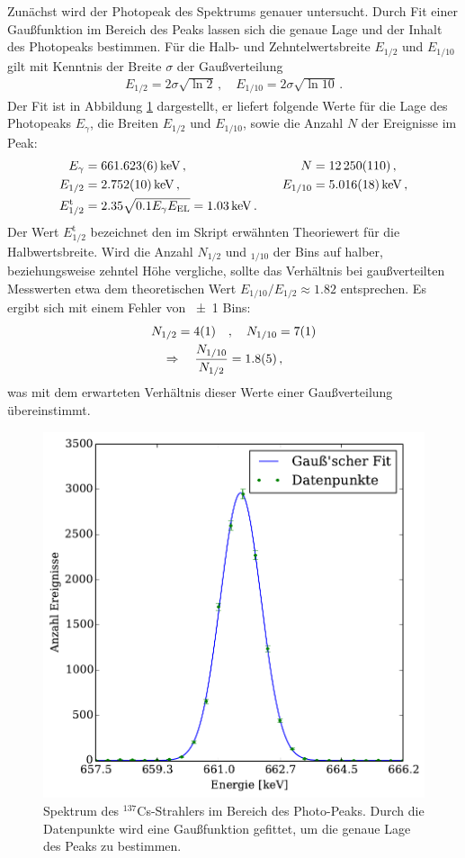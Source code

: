 Zunächst wird der Photopeak des Spektrums genauer untersucht. Durch Fit einer
Gaußfunktion im Bereich des Peaks lassen sich die genaue Lage und der Inhalt
des Photopeaks bestimmen.
Für die Halb- und Zehntelwertsbreite $E_{1/2}$ und $E_{1/10}$ gilt mit Kenntnis
der Breite $\sigma$ der Gaußverteilung
\begin{align*}
    E_{1/2} = 2\sigma\sqrt{\ln 2}\,,\quad E_{1/10} = 2\sigma\sqrt{\ln 10}\,.
\end{align*}
Der Fit ist in Abbildung \ref{fig:cs_gauss} dargestellt, er liefert folgende
Werte für die Lage des Photopeaks $E_\gamma$, die Breiten $E_{1/2}$ und
$E_{1/10}$, sowie die Anzahl $N$ der Ereignisse im Peak:
\begin{align*}
    E_\gamma &= \SI{661.623+-0.006}{keV} \,,&\quad N &= \num{12250+-110}\,,\\
    E_{1/2} &= \SI{2.752+-0.010}{keV}\,,&\quad E_{1/10} &= \SI{5.016+-0.018}{keV}\,,\\
    E_{1/2}^\text{t} &= \num{2.35} \sqrt{\num{0.1} E_\gamma E_\text{EL}} = \SI{1.03+-0.00}{keV}\,.
\end{align*}
Der Wert $E_{1/2}^\text{t}$ bezeichnet den im Skript erwähnten Theoriewert
für die Halbwertsbreite.
Wird die Anzahl $N_{1/2}$ und $_{1/10}$ der Bins auf halber, beziehungsweise
zehntel Höhe vergliche, sollte das Verhältnis bei gaußverteilten Messwerten
etwa dem theoretischen Wert $E_{1/10}/E_{1/2}\approx \num{1.82}$ entsprechen.
Es ergibt sich mit einem Fehler von \num{+-1} Bins:
\begin{align*}
    N_{1/2} = \num{4+-1} \quad&,\quad N_{1/10} = \num{7+-1} \\
    \Rightarrow\quad\frac{N_{1/10}}{N_{1/2}} &= \num{1.8+-0.5}\,,
\end{align*}
was mit dem erwarteten Verhältnis dieser Werte einer Gaußverteilung
übereinstimmt.
\begin{figure}
    \centering
    \includegraphics[width=0.7\linewidth]{img/06_caesium_fit.pdf}
    \caption{
        Spektrum des $^{137}$Cs-Strahlers im Bereich des Photo-Peaks. Durch
        die Datenpunkte wird eine Gaußfunktion gefittet, um die genaue Lage
        des Peaks zu bestimmen.
    }
    \label{fig:cs_gauss}
\end{figure}

